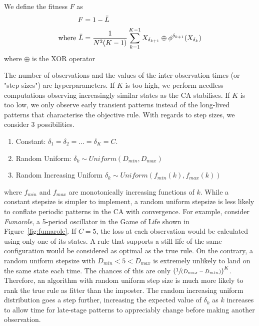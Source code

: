 \begin{definition}
We define the fitness $F$ as
\begin{align*}
    F &= 1 - \bar{L}\\
    \textnormal{where\ } \bar{L} &= \frac{1}{N^2(K-1)}\sum_{k=1}^{K-1} X_{\delta_{k+1}} \oplus \phi^{\delta_{k+1}}(X_{\delta_k})
\end{align*}
where $\oplus$ is the XOR operator
\end{definition}

The number of observations and the values of the inter-observation times (or "step sizes") are hyperparameters. If $K$ is too high, we perform needless computations observing increasingly similar states as the CA stabilises. If $K$ is too low, we only observe early transient patterns instead of the long-lived patterns that characterise the objective rule. With regards to step sizes, we consider 3 possibilities.

\begin{enumerate}
    \item Constant: $\delta_1 = \delta_2 = ... = \delta_K = C$.
    \item Random Uniform: $\delta_k \sim \mathit{Uniform}(D_{min}, D_{max})$
    \item Random Increasing Uniform $\delta_k \sim \mathit{Uniform}(f_{min}(k), f_{max}(k))$
\end{enumerate}

where $f_{min}$ and $f_{max}$ are monotonically increasing functions of $k$. While a constant stepsize is simpler to implement, a random uniform stepsize is less likely to conflate periodic patterns in the CA with convergence. For example, consider \textit{Fumarole}, a 5-period oscillator in the Game of Life shown in Figure~\ref{fig:fumarole}. If $C=5$, the loss at each observation would be calculated using only one of its states. A rule that supports a still-life of the same configuration would be considered as optimal as the true rule. On the contrary, a random uniform stepsize with $D_{min} < 5 < D_{max}$ is extremely unlikely to land on the same state each time. The chances of this are only $\left(\sfrac{1}{(D_{max} - D_{min})}\right)^K$. Therefore, an algorithm with random uniform step size is much more likely to rank the true rule as fitter than the imposter. The random increasing uniform distribution goes a step further, increasing the expected value of $\delta_k$ as $k$ increases to allow time for late-stage patterns to appreciably change before making another observation.\\

